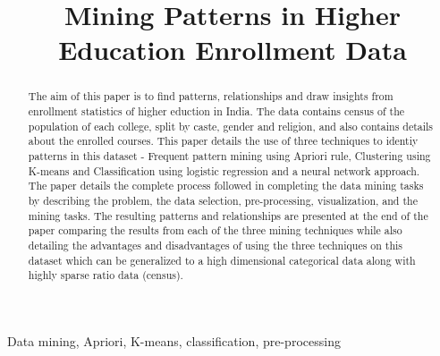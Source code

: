 \documentclass[conference]{IEEEtran}
\begin{document}
\title{Mining Patterns in Higher Education Enrollment Data}

\author{
\and
{}
\and
{}
}

\maketitle

\begin{abstract}
The aim of this paper is to find patterns, relationships and draw insights from enrollment statistics of higher eduction in India. The data contains census of the population of each college, split by caste, gender and religion, and also contains details about the enrolled courses. This paper details the use of three techniques to identiy patterns in this dataset - Frequent pattern mining using Apriori rule, Clustering using K-means and Classification using logistic regression and a neural network approach. The paper details the complete process followed in completing the data mining tasks by describing the problem, the data selection, pre-processing, visualization, and the mining tasks. The resulting patterns and relationships are presented at the end of the paper comparing the results from each of the three mining techniques while also detailing the advantages and disadvantages of using the three techniques on this dataset which can be generalized to a high dimensional categorical data along with highly sparse ratio data (census).
\end{abstract}

\begin{IEEEkeywords}
Data mining, Apriori, K-means, classification, pre-processing
\end{IEEEkeywords}
\end{document}
